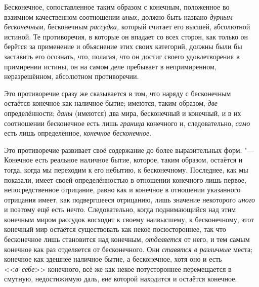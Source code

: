 Бесконечное, сопоставленное таким образом с конечным, положенное во взаимном
качественном соотношении {\em иных,} должно быть
названо {\em дурным бесконечным,} бесконечным
{\em рассудка,} который считает его высшей, абсолютной
истиной. Те противоречия, в которые он впадает со всех сторон, как только
он берётся за применение и объяснение этих своих категорий, должны были бы
заставить его осознать, что, полагая, что он достиг своего удовлетворения в
примирении истины, он на самом деле пребывает в непримиренном,
неразрешённом, абсолютном противоречии.

Это противоречие сразу же сказывается в том, что наряду с бесконечным
остаётся конечное как наличное бытие; имеются, таким образом,
{\em две} определённости;
{\em даны} (имеются) два мира, бесконечный и конечный,
и в их соотношении бесконечное есть лишь {\em граница}
конечного и, следовательно, {\em само} есть лишь
определённое, {\em конечное бесконечное}.

Это противоречие развивает своё содержание до более выразительных форм. "---
Конечное есть реальное наличное бытие, которое, таким образом, остаётся и
тогда, когда мы переходим к его небытию, к бесконечному. Последнее, как мы
показали, имеет своей определённостью в отношении конечного лишь первое,
непосредственное отрицание, равно как и конечное в отношении указанного
отрицания имеет, как подвергшееся отрицанию, лишь значение некоторого
{\em иного} и поэтому ещё есть нечто. Следовательно,
когда поднимающийся над этим конечным миром рассудок восходит к своему
наивысшему, к бесконечному, этот конечный мир остаётся существовать как
некое посюстороннее, так что бесконечное лишь становится над конечным,
{\em отделяется} от него, и тем самым конечное как раз
отделяется от бесконечного. Они {\em ставятся в
различные} места; конечное как здешнее наличное бытие, а бесконечное, хотя
оно и есть <<{\em в~себе}>> конечного, всё же как некое
потустороннее перемещается в смутную, недостижимую даль,
{\em вне} которой находится и остаётся конечное.


